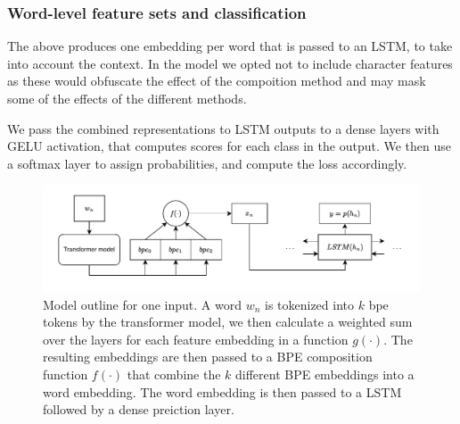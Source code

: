 \documentclass[11pt]{article}
\newcommand\jp[1]{(\textbf{JP:} #1)}
\begin{document}
       
        \subsubsection{Word-level feature sets and classification}
                   The above produces one embedding per word that is
     passed to an LSTM, to take into account the context. In the model
     we opted not to include character features as these would
     obfuscate the effect of the compoition method and may mask some
     of the effects of the different methods.

        We pass the combined representations to LSTM outputs to a
        dense layers with GELU activation, that computes scores
        for each class in the output. We then use a softmax layer to
        assign probabilities, and compute the loss accordingly.

	\begin{figure}%
	\centering
	\includegraphics[scale=0.5]{single_step.pdf}
    \caption{\label{fig:model} Model outline for one input. A
     word $w_n$ is tokenized into $k$ bpe tokens by the transformer
     model, we then calculate a weighted sum over the layers for each
     feature embedding in a function $g(\cdot)$. The resulting
     embeddings are then passed to a BPE composition function
     $f(\cdot)$ that combine the $k$ different BPE embeddings into a
     word embedding. The word embedding is then passed to a LSTM
     followed by a dense preiction layer. }
	\end{figure}

	
\end{document}
